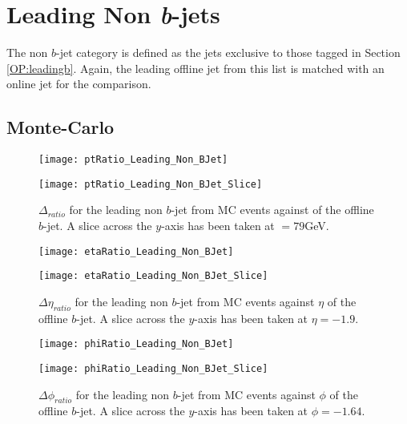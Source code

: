 \newpage
\section{Leading Non \textit{b}-jets}

	The non $b$-jet category is defined as the jets exclusive to those tagged in Section \ref{OP:leadingb}. Again, the leading \pt offline jet from this list is matched with an online jet for the comparison.

\newpage
	\subsection{Monte-Carlo}
	
		\begin{figure}[h]
			\centering
			\begin{minipage}[h]{0.33\linewidth}
				\texttt{[image: ptRatio\_Leading\_Non\_BJet]}
				
			\end{minipage}
			\quad
			\begin{minipage}[h]{0.33\linewidth}
				\texttt{[image: ptRatio\_Leading\_Non\_BJet\_Slice]}
			\end{minipage}
			\caption{$\Delta $\pt$_{ratio}$ for the leading \pt non $b$-jet from MC events against \pt of the offline $b$-jet. A slice across the $y$-axis has been taken at \pt$=79$GeV. }
			\label{fig:MC:nonleadingbpt}
		\end{figure}
		
		\begin{figure}[h]
			\centering
			
			\begin{minipage}[h]{0.33\linewidth}
				\texttt{[image: etaRatio\_Leading\_Non\_BJet]}
			\end{minipage}
			\quad
			\begin{minipage}[h]{0.33\linewidth}
				\texttt{[image: etaRatio\_Leading\_Non\_BJet\_Slice]}
			\end{minipage}
			\caption{$\Delta \eta_{ratio}$ for the leading \pt non $b$-jet from MC events against $\eta$ of the offline $b$-jet. A slice across the $y$-axis has been taken at $\eta=-1.9$. }
			\label{fig:MC:nonleadingbeta}
		\end{figure}
		
		\begin{figure}[h]
			\centering
			
			\begin{minipage}[h]{0.33\linewidth}
				\texttt{[image: phiRatio\_Leading\_Non\_BJet]}
			\end{minipage}
			\quad
			\begin{minipage}[h]{0.33\linewidth}
				\texttt{[image: phiRatio\_Leading\_Non\_BJet\_Slice]}
			\end{minipage}
			\caption{$\Delta \phi_{ratio}$ for the leading \pt non $b$-jet from MC events against $\phi$ of the offline $b$-jet. A slice across the $y$-axis has been taken at $\phi=-1.64$. }
			\label{fig:MC:nonleadingbphi}
		\end{figure}
		
